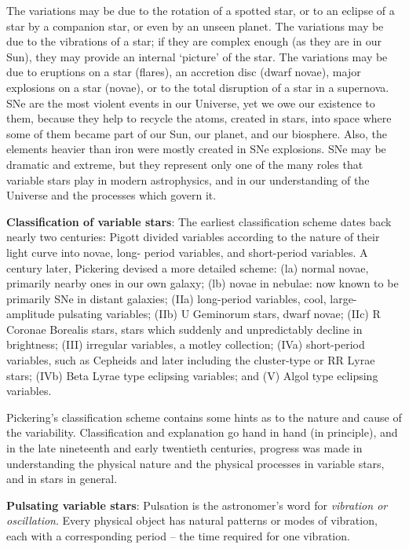 \documentclass[a4paper,10pt]{article}
\begin{document}
{\noindent}The variations may be due to the rotation of a spotted star, or to an eclipse of a star by a companion star, or even by an unseen planet. The variations may be due to the vibrations of a star; if they are complex enough (as they are in our Sun), they may provide an internal `picture' of the star. The variations may be due to eruptions on a star (flares), an accretion disc (dwarf novae), major explosions on a star (novae), or to the total disruption of a star in a supernova. SNe are the most violent events in our Universe, yet we owe our existence to them, because they help to recycle the atoms, created in stars, into space where some of them became part of our Sun, our planet, and our biosphere. Also, the elements heavier than iron were mostly created in SNe explosions. SNe may be dramatic and extreme, but they represent only one of the many roles that variable stars play in modern astrophysics, and in our understanding of the Universe and the processes which govern it.

{\noindent}\textbf{Classification of variable stars}: The earliest classification scheme dates back nearly two centuries: Pigott divided variables according to the nature of their light curve into novae, long- period variables, and short-period variables. A century later, Pickering devised a more detailed scheme: (la) normal novae, primarily nearby ones in our own galaxy; (lb) novae in nebulae: now known to be primarily SNe in distant galaxies; (IIa) long-period variables, cool, large-amplitude pulsating variables; (IIb) U Geminorum stars, dwarf novae; (IIc) R Coronae Borealis stars, stars which suddenly and unpredictably decline in brightness; (III) irregular variables, a motley collection; (IVa) short-period variables, such as Cepheids and later including the cluster-type or RR Lyrae stars; (IVb) Beta Lyrae type eclipsing variables; and (V) Algol type eclipsing variables.

{\noindent}Pickering's classification scheme contains some hints as to the nature and cause of the variability. Classification and explanation go hand in hand (in principle), and in the late nineteenth and early twentieth centuries, progress was made in understanding the physical nature and the physical processes in variable stars, and in stars in general.

{\noindent}\textbf{Pulsating variable stars}: Pulsation is the astronomer's word for \textit{vibration or oscillation}. Every physical object has natural patterns or modes of vibration, each with a corresponding period -- the time required for one vibration.
\end{document}
